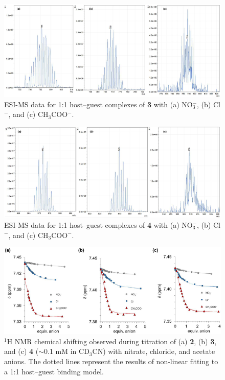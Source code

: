 \begin{figure}
    \centering
    \includegraphics[width=0.8\linewidth]{figures/pub2/si_fig8.png}
    \caption{ESI-MS data for 1:1 host–guest complexes of \textbf{3} with (a) NO$_{3}^{-}$, (b) Cl$^{-}$, and (c) CH$_{3}$COO$^{-}$.}\label{fig:esi3}
\end{figure}

\begin{figure}
    \centering
    \includegraphics[width=0.8\linewidth]{figures/pub2/si_fig9.png}
    \caption{ESI-MS data for 1:1 host–guest complexes of \textbf{4} with (a) NO$_{3}^{-}$, (b) Cl$^{-}$, and (c) CH$_{3}$COO$^{-}$.}\label{fig:esi4}
\end{figure}

\begin{figure}
    \centering
    \includegraphics[width=0.8\linewidth]{figures/pub2/si_fig10.png}
    \caption{$^{1}$H NMR chemical shifting observed during titration of (a) \textbf{2}, (b) \textbf{3}, and (c) \textbf{4} ($\sim$0.1 mM in CD$_{3}$CN) with nitrate, chloride, and acetate anions. The dotted lines represent the results of non-linear fitting to a 1:1 host–guest binding model.}\label{fig:hnmr-shift}
\end{figure}